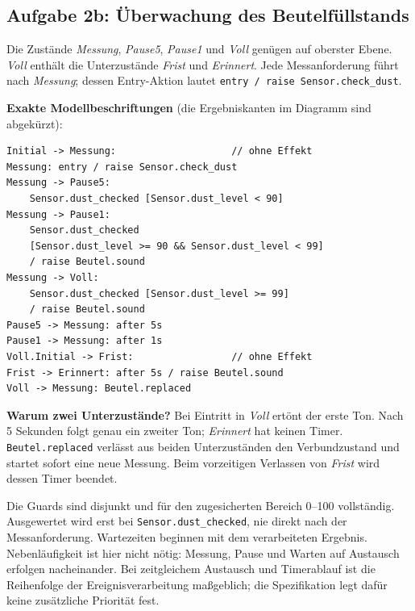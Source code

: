 \subsection*{Aufgabe 2b: Überwachung des Beutelfüllstands}
Die Zustände \textit{Messung}, \textit{Pause5}, \textit{Pause1} und \textit{Voll} genügen auf oberster Ebene. \textit{Voll} enthält die Unterzustände \textit{Frist} und \textit{Erinnert}. Jede Messanforderung führt nach \textit{Messung}; dessen Entry-Aktion lautet \texttt{entry / raise Sensor.check\_dust}.
\begin{center}
\end{center}
\textbf{Exakte Modellbeschriftungen} (die Ergebniskanten im Diagramm sind abgekürzt):
\begin{lstlisting}
Initial -> Messung:                    // ohne Effekt
Messung: entry / raise Sensor.check_dust
Messung -> Pause5:
    Sensor.dust_checked [Sensor.dust_level < 90]
Messung -> Pause1:
    Sensor.dust_checked
    [Sensor.dust_level >= 90 && Sensor.dust_level < 99]
    / raise Beutel.sound
Messung -> Voll:
    Sensor.dust_checked [Sensor.dust_level >= 99]
    / raise Beutel.sound
Pause5 -> Messung: after 5s
Pause1 -> Messung: after 1s
Voll.Initial -> Frist:                 // ohne Effekt
Frist -> Erinnert: after 5s / raise Beutel.sound
Voll -> Messung: Beutel.replaced
\end{lstlisting}
\textbf{Warum zwei Unterzustände?} Bei Eintritt in \textit{Voll} ertönt der erste Ton. Nach 5 Sekunden folgt genau ein zweiter Ton; \textit{Erinnert} hat keinen Timer. \texttt{Beutel.replaced} verlässt aus beiden Unterzuständen den Verbundzustand und startet sofort eine neue Messung. Beim vorzeitigen Verlassen von \textit{Frist} wird dessen Timer beendet.

Die Guards sind disjunkt und für den zugesicherten Bereich 0--100 vollständig. Ausgewertet wird erst bei \texttt{Sensor.dust\_checked}, nie direkt nach der Messanforderung. Wartezeiten beginnen mit dem verarbeiteten Ergebnis. Nebenläufigkeit ist hier nicht nötig: Messung, Pause und Warten auf Austausch erfolgen nacheinander. Bei zeitgleichem Austausch und Timerablauf ist die Reihenfolge der Ereignisverarbeitung maßgeblich; die Spezifikation legt dafür keine zusätzliche Priorität fest.

